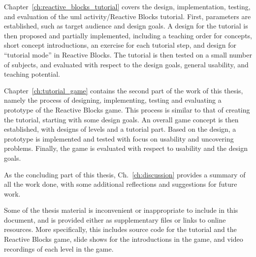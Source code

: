 \noindent
Chapter~\ref{ch:reactive_blocks_tutorial} covers the design, implementation, testing, and evaluation of the \gls{uml} activity/Reactive Blocks tutorial. First, parameters are established, such as target audience and design goals. A design for the tutorial is then proposed and partially implemented, including a teaching order for concepts, short concept introductions, an exercise for each tutorial step, and design for ``tutorial mode'' in Reactive Blocks. The tutorial is then tested on a small number of subjects, and evaluated with respect to the design goals, general usability, and teaching potential.

\noindent
Chapter~\ref{ch:tutorial_game} contains the second part of the work of this thesis, namely the process of designing, implementing, testing and evaluating a prototype of the Reactive Blocks game. This process is similar to that of creating the tutorial, starting with some design goals. An overall game concept is then established, with designs of levels and a tutorial part. Based on the design, a prototype is implemented and tested with focus on usability and uncovering problems. Finally, the game is evaluated with respect to usability and the design goals.

\noindent
As the concluding part of this thesis, Ch.~\ref{ch:discussion} provides a summary of all the work done, with some additional reflections and suggestions for future work.

\noindent
Some of the thesis material is inconvenient or inappropriate to include in this document, and is provided either as supplementary files or links to online resources. More specifically, this includes source code for the tutorial and the Reactive Blocks game, slide shows for the introductions in the game, and video recordings of each level in the game.